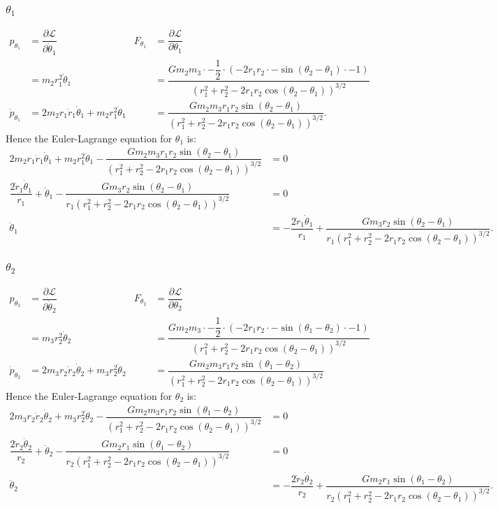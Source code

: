 \documentclass[12pt,a4paper,portrait]{article}
\begin{document}
	\subsubsection{$\theta_1$}
	\begin{align*}
		p_{\theta_1} &= \dfrac{\partial \mathcal{L}}{\partial \dot{\theta}_1} & F_{\theta_1} &= \dfrac{\partial \mathcal{L}}{\partial \theta_1}\\
		&= m_2 r_1^2 \dot{\theta}_1 & &= \dfrac{Gm_2 m_3\cdot-\dfrac{1}{2}\cdot (-2r_1r_2\cdot -\sin{(\theta_2-\theta_1)\cdot -1})}{(r_1^2 + r_2^2 - 2r_1 r_2 \cos{(\theta_2-\theta_1)})^{3/2}} \\
		\dot{p}_{\theta_1} &= 2m_2 r_1\dot{r}_1 \dot{\theta}_1 + m_2 r_1^2 \ddot{\theta}_1 & &= \dfrac{Gm_2 m_3 r_1 r_2 \sin{(\theta_2-\theta_1)}}{(r_1^2 + r_2^2 - 2r_1 r_2 \cos{(\theta_2-\theta_1)})^{3/2}}.
	\end{align*}
	Hence the Euler-Lagrange equation for $\theta_1$ is:
	\begin{align*}
		2m_2 r_1\dot{r}_1 \dot{\theta}_1 + m_2 r_1^2 \ddot{\theta}_1 - \dfrac{Gm_2 m_3 r_1 r_2 \sin{(\theta_2-\theta_1)}}{(r_1^2 + r_2^2 - 2r_1 r_2 \cos{(\theta_2-\theta_1)})^{3/2}} &= 0 \\
		\dfrac{2\dot{r}_1 \dot{\theta}_1}{r_1} + \ddot{\theta}_1 - \dfrac{Gm_3r_2\sin{(\theta_2-\theta_1)}}{r_1(r_1^2 + r_2^2 - 2r_1 r_2 \cos{(\theta_2-\theta_1)})^{3/2}} &= 0\\
		\ddot{\theta}_1 &= -\dfrac{2\dot{r}_1 \dot{\theta}_1}{r_1} + \dfrac{Gm_3r_2\sin{(\theta_2-\theta_1)}}{r_1(r_1^2 + r_2^2 - 2r_1 r_2 \cos{(\theta_2-\theta_1)})^{3/2}}.
	\end{align*}
	
	\subsubsection{$\theta_2$}
	\begin{align*}	
		p_{\theta_2} &= \dfrac{\partial \mathcal{L}}{\partial \dot{\theta}_2} & F_{\theta_2} &= \dfrac{\partial \mathcal{L}}{\partial \theta_2}\\
		&= m_3 r_2^2 \dot{\theta}_2 & &= \dfrac{Gm_2m_3\cdot -\dfrac{1}{2} \cdot (-2r_1r_2 \cdot -\sin{(\theta_1-\theta_2)\cdot -1})}{(r_1^2 + r_2^2 - 2r_1 r_2 \cos{(\theta_2-\theta_1)})^{3/2}}\\
		\dot{p}_{\theta_2} &= 2m_3 r_2 \dot{r}_2 \dot{\theta}_2 + m_3r_2^2 \ddot{\theta}_2 & &= \dfrac{Gm_2m_3r_1r_2 \sin{(\theta_1-\theta_2)}}{(r_1^2 + r_2^2 - 2r_1 r_2 \cos{(\theta_2-\theta_1)})^{3/2}}
	\end{align*}
	Hence the Euler-Lagrange equation for $\theta_2$ is:
	\begin{align*}
		2m_3 r_2 \dot{r}_2 \dot{\theta}_2 + m_3r_2^2 \ddot{\theta}_2 - \dfrac{Gm_2m_3r_1r_2 \sin{(\theta_1-\theta_2)}}{(r_1^2 + r_2^2 - 2r_1 r_2 \cos{(\theta_2-\theta_1)})^{3/2}} &= 0 \\
		\dfrac{2\dot{r}_2 \dot{\theta}_2}{r_2} + \ddot{\theta}_2 - \dfrac{Gm_2r_1\sin{(\theta_1-\theta_2)}}{r_2(r_1^2 + r_2^2 - 2r_1 r_2 \cos{(\theta_2-\theta_1)})^{3/2}} &= 0\\
		\ddot{\theta}_2 &= -\dfrac{2\dot{r}_2 \dot{\theta}_2}{r_2} + \dfrac{Gm_2r_1\sin{(\theta_1-\theta_2)}}{r_2(r_1^2 + r_2^2 - 2r_1 r_2 \cos{(\theta_2-\theta_1)})^{3/2}}.
	\end{align*}
\end{document}
